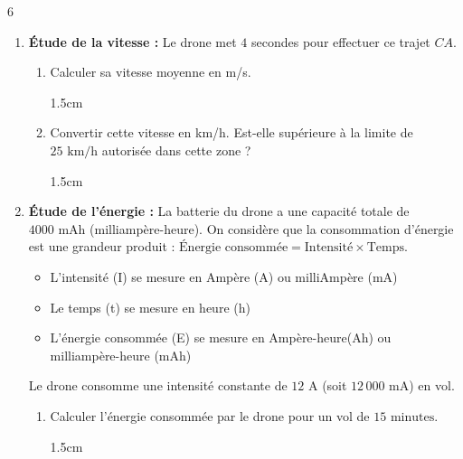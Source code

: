 \documentclass[a4paper]{book}
\begin{document}
{\begin{exerciceNote}{6}
\begin{enumerate}[leftmargin=*]
\vfill

\hfill Tourner la page !

\newpage
            
            \item \textbf{Étude de la vitesse :} Le drone met $4$ secondes pour effectuer ce trajet $CA$. 
            \begin{enumerate}
                \item Calculer sa vitesse moyenne en m/s.
                \begin{ZoneReponse}{1.5cm}                
                \end{ZoneReponse}
                
                \item Convertir cette vitesse en km/h. Est-elle supérieure à la limite de $25\text{ km/h}$ autorisée dans cette zone ?
                \begin{ZoneReponse}{1.5cm}                
                \end{ZoneReponse}
            \end{enumerate}
        
            \item \textbf{Étude de l'énergie :} 
            La batterie du drone a une capacité totale de $4000\text{ mAh}$ (milliampère-heure). 
            On considère que la consommation d'énergie est une grandeur produit : $\text{Énergie consommée} = \text{Intensité} \times \text{Temps}$.

            \begin{itemize}
               \item L'intensité (I) se mesure en Ampère (A) ou milliAmpère (mA)
               \item Le temps (t) se mesure en heure (h)
               \item L'énergie consommée (E) se mesure en Ampère-heure(Ah) ou milliampère-heure (mAh)
            \end{itemize}      
            
            Le drone consomme une intensité constante de $12\text{ A}$ (soit $12\,000\text{ mA}$) en vol.
            \begin{enumerate}[leftmargin=*]
                \item Calculer l'énergie consommée par le drone pour un vol de $15\text{ minutes}$.
                \begin{ZoneReponse}{1.5cm}                
                \end{ZoneReponse}
                

\end{enumerate}
\end{enumerate}
\end{exerciceNote}}
\end{document}

